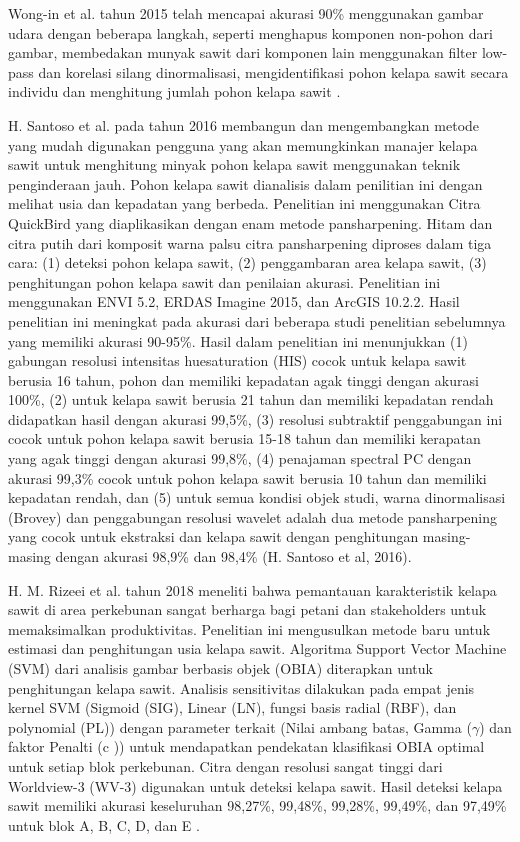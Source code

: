 Wong-in et al. tahun 2015 telah mencapai akurasi 90\% menggunakan gambar udara dengan beberapa langkah, seperti menghapus komponen non-pohon dari gambar, membedakan munyak sawit dari komponen lain menggunakan filter low-pass dan korelasi silang dinormalisasi, mengidentifikasi pohon kelapa sawit secara individu dan menghitung jumlah pohon kelapa sawit \citep{Wong-in2015-jv}.

H. Santoso et al. pada tahun 2016 membangun dan mengembangkan metode yang mudah digunakan pengguna yang akan memungkinkan manajer kelapa sawit untuk menghitung minyak pohon kelapa sawit menggunakan teknik penginderaan jauh. Pohon kelapa sawit dianalisis dalam penilitian ini dengan melihat usia dan kepadatan yang berbeda. Penelitian ini menggunakan Citra QuickBird yang diaplikasikan dengan enam metode pansharpening. Hitam dan citra putih dari komposit warna palsu citra pansharpening diproses dalam tiga cara: (1) deteksi pohon kelapa sawit, (2) penggambaran area kelapa sawit, (3) penghitungan pohon kelapa sawit dan penilaian akurasi. Penelitian ini menggunakan ENVI 5.2, ERDAS Imagine 2015, dan ArcGIS 10.2.2. Hasil penelitian ini meningkat pada akurasi dari beberapa studi penelitian sebelumnya yang memiliki akurasi 90-95\%. Hasil dalam penelitian ini menunjukkan (1) gabungan resolusi intensitas huesaturation (HIS) cocok untuk kelapa sawit berusia 16 tahun, pohon dan memiliki kepadatan agak tinggi dengan akurasi 100\%, (2) untuk kelapa sawit berusia 21 tahun dan memiliki kepadatan rendah didapatkan hasil dengan akurasi 99,5\%, (3) resolusi subtraktif penggabungan ini cocok untuk pohon kelapa sawit berusia 15-18 tahun dan memiliki kerapatan yang agak tinggi dengan akurasi 99,8\%, (4) penajaman spectral PC dengan akurasi 99,3\% cocok untuk pohon kelapa sawit berusia 10 tahun dan memiliki kepadatan rendah, dan (5) untuk semua kondisi objek studi, warna dinormalisasi (Brovey) dan penggabungan resolusi wavelet adalah dua metode pansharpening yang cocok untuk ekstraksi dan kelapa sawit dengan penghitungan masing-masing dengan akurasi 98,9\% dan 98,4\% (H. Santoso et al, 2016).

H. M. Rizeei et al. tahun 2018 meneliti bahwa pemantauan karakteristik kelapa sawit di area perkebunan sangat berharga bagi petani dan stakeholders untuk memaksimalkan produktivitas. Penelitian ini mengusulkan metode baru untuk estimasi dan penghitungan usia kelapa sawit. Algoritma Support Vector Machine (SVM) dari analisis gambar berbasis objek (OBIA) diterapkan untuk penghitungan kelapa sawit. Analisis sensitivitas dilakukan pada empat jenis kernel SVM (Sigmoid (SIG), Linear (LN), fungsi basis radial (RBF), dan polynomial (PL)) dengan parameter terkait (Nilai ambang batas, Gamma ($\gamma$) dan faktor Penalti (c )) untuk mendapatkan pendekatan klasifikasi OBIA optimal untuk setiap blok perkebunan. Citra dengan resolusi sangat tinggi dari Worldview-3 (WV-3) digunakan untuk deteksi kelapa sawit. Hasil deteksi kelapa sawit memiliki akurasi keseluruhan 98,27\%, 99,48\%, 99,28\%, 99,49\%, dan 97,49\% untuk blok A, B, C, D, dan E \citep{Rizeei2018-yr}.

